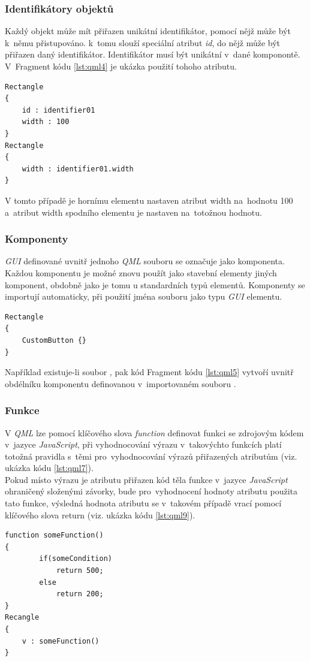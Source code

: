 \documentclass[11pt,twoside,a4paper]{book}
\begin{document}
\subsubsection{Identifikátory objektů}
Každý objekt může mít přiřazen unikátní identifikátor, pomocí nějž může být k~němu přistupováno.  k~tomu slouží speciální atribut \textit{id}, do nějž může být přiřazen daný identifikátor. Identifikátor musí být unikátní v~dané komponontě. V~Fragment kódu \ref{lst:qml4} je ukázka použití tohoho atributu.
\begin{lstlisting}[frame=single,caption=Ukázka použití atributu id.,label=lst:qml4]
Rectangle
{
	id : identifier01
	width : 100
}
Rectangle
{
	width : identifier01.width
}
\end{lstlisting}
V tomto případě je hornímu elementu nastaven atribut width na~hodnotu 100 a~atribut width spodního elementu je nastaven na~totožnou hodnotu.

\subsubsection{Komponenty}
\textit{GUI} definované uvnitř jednoho \textit{QML} souboru se označuje jako komponenta. Každou komponentu je možné znovu použít jako stavební elementy jiných komponent, obdobně jako je tomu u standardních typů elementů. Komponenty se importují automaticky, při použití jména souboru jako typu \textit{GUI} elementu.

\begin{lstlisting}[frame=single,caption=Ukázka použití komponenty z jiného souboru.,label=lst:qml5]
Rectangle
{
	CustomButton {}
}
\end{lstlisting}
Například existuje-li soubor , pak kód Fragment kódu \ref{lst:qml5} vytvoří uvnitř obdélníku komponentu definovanou v~importovaném souboru .

\subsubsection{Funkce}

V \textit{QML} lze pomocí klíčového slova \textit{function} definovat funkci se zdrojovým kódem v~jazyce \textit{JavaScript}, při vyhodnocování výrazu v~takovýchto funkcích platí totožná pravidla s~těmi pro~vyhodnocování výrazů přiřazených atributům (viz. ukázka kódu \ref{lst:qml7}).\\
Pokud místo výrazu je atributu přiřazen kód těla funkce v~jazyce \textit{JavaScript} ohraničený složenými závorky, bude pro~vyhodnocení hodnoty atributu použita tato funkce, výsledná hodnota atributu se v~takovém případě vrací pomocí klíčového slova return (viz. ukázka kódu \ref{lst:qml9}).
\begin{lstlisting}[frame=single,caption=Ukázka použití funkce definované pomocí klíčového slova \textit{function} pro určení hodnoty atributu.,label=lst:qml7]
function someFunction()
{
		if(someCondition)
			return 500;
		else
			return 200;
}
Recangle
{
	v : someFunction()
}
\end{lstlisting}
\end{document}
